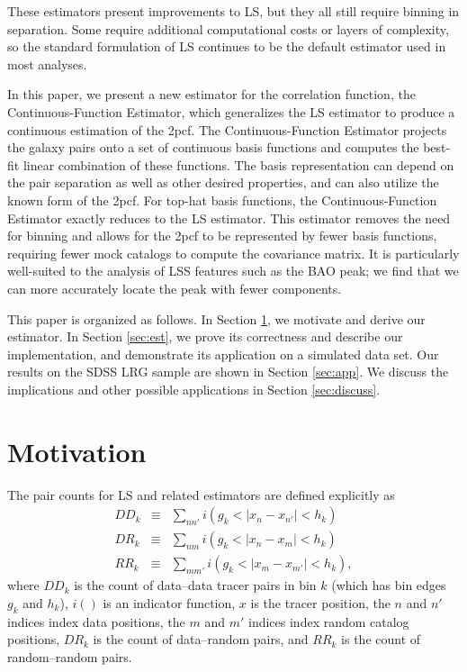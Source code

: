 \documentclass[modern]{aastex62}
\newcommand{\cf}{2pcf\xspace} %
\newcommand{\Est}{The Continuous-Function Estimator\xspace}
\newcommand{\est}{the Continuous-Function Estimator\xspace}
\newcommand{\LS}{LS\xspace}
\begin{document}
These estimators present improvements to \LS, but they all still require binning in separation.
Some require additional computational costs or layers of complexity, so the standard formulation of \LS continues to be the default estimator used in most analyses. %

In this paper, we present a new estimator for the correlation function, \est, which generalizes the \LS estimator to produce a continuous estimation of the \cf. 
\Est projects the galaxy pairs onto a set of continuous basis functions and computes the best-fit linear combination of these functions.
The basis representation can depend on the pair separation as well as other desired properties, and can also utilize the known form of the \cf.
For top-hat basis functions, \est exactly reduces to the \LS estimator. 
This estimator removes the need for binning and allows for the \cf to be represented by fewer basis functions, requiring fewer mock catalogs to compute the covariance matrix.
It is particularly well-suited to the analysis of LSS features such as the BAO peak; we find that we can more accurately locate the peak with fewer components.

This paper is organized as follows. 
In Section \ref{sec:motiv}, we motivate and derive our estimator. 
In Section \ref{sec:est}, we prove its correctness and describe our implementation, and demonstrate its application on a simulated data set. 
Our results on the SDSS LRG sample are shown in Section \ref{sec:app}. 
We discuss the implications and other possible applications in Section \ref{sec:discuss}. 

\section{Motivation} \label{sec:motiv}

The pair counts for \LS and related estimators are defined explicitly as
\begin{eqnarray}\displaystyle
DD_k &\equiv& \sum_{n n'} i(g_k < |x_n - x_{n'}| < h_k) \\
DR_k &\equiv& \sum_{n m} i(g_k < |x_n - x_m| < h_k) \\
RR_k &\equiv& \sum_{m m'} i(g_k < |x_m - x_{m'}| < h_k),
\end{eqnarray}
where $DD_k$ is the count of data--data tracer pairs in bin $k$ (which has bin edges $g_k$ and $h_k$), $i()$ is an indicator function, $x$ is the tracer position, the $n$ and $n'$ indices index data positions, the $m$ and $m'$ indices index random catalog positions, $DR_k$ is the count of data--random pairs, and $RR_k$ is the count of random--random pairs.
\end{document}

